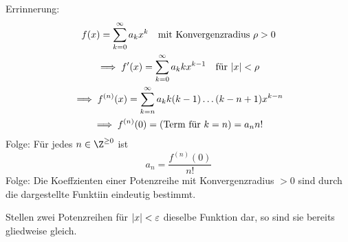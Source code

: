 Errinnerung:
\begin{gather*}
	f(x) = \sum_{k=0}^\infty a_k x^k \quad \text{mit Konvergenzradius } \rho > 0 \\
	\implies f'(x) = \sum_{k=0}^\infty a_k k x^{k-1} \quad \text{für } \abs{x} < \rho \\
	\implies f^{(n)}(x) = \sum_{k=n}^\infty a_k k (k-1) \dots (k-n+1) x^{k-n} \\
	\implies f^{(n)}(0) = (\text{Term für } k=n) = a_n n!
\end{gather*}
Folge: Für jedes $n \in \Z^{\geq 0}$ ist
\[ a_n = \frac{f^{(n)}(0)}{n!} \]
Folge: Die Koeffzienten einer Potenzreihe mit Konvergenzradius $> 0$ sind durch die dargestellte Funktiin eindeutig bestimmt.\\
\begin{satz*}[note = Potenzreihen Identitätssatz]
	\begin{folge}
		Stellen zwei Potenzreihen für $\abs{x} < \varepsilon$ dieselbe Funktion dar, so sind sie bereits gliedweise gleich.
	\end{folge}
\end{satz*}

